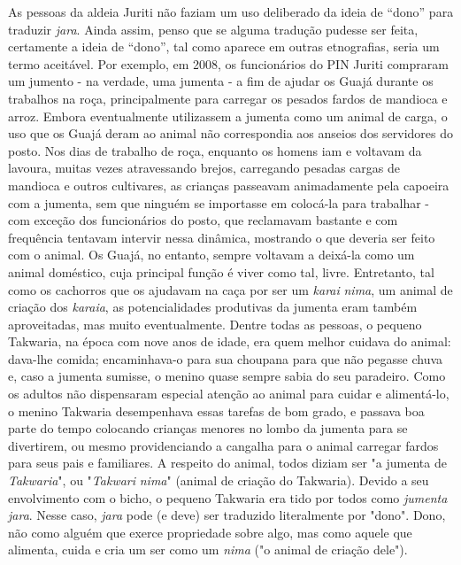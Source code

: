 As pessoas da aldeia Juriti não faziam um uso deliberado da ideia de
``dono'' para traduzir \emph{jara}. Ainda assim, penso que se alguma
tradução pudesse ser feita, certamente a ideia de ``dono'', tal como
aparece em outras etnografias, seria um termo aceitável. Por exemplo, em
2008, os funcionários do PIN Juriti compraram um jumento - na verdade,
uma jumenta - a fim de ajudar os Guajá durante os trabalhos na roça,
principalmente para carregar os pesados fardos de mandioca e arroz.
Embora eventualmente utilizassem a jumenta como um animal de carga, o
uso que os Guajá deram ao animal não correspondia aos anseios dos
servidores do posto. Nos dias de trabalho de roça, enquanto os homens
iam e voltavam da lavoura, muitas vezes atravessando brejos, carregando
pesadas cargas de mandioca e outros cultivares, as crianças passeavam
animadamente pela capoeira com a jumenta, sem que ninguém se importasse
em colocá-la para trabalhar - com exceção dos funcionários do posto, que
reclamavam bastante e com frequência tentavam intervir nessa dinâmica,
mostrando o que deveria ser feito com o animal. Os Guajá, no entanto,
sempre voltavam a deixá-la como um animal doméstico, cuja principal
função é viver como tal, livre. Entretanto, tal como os cachorros que os
ajudavam na caça por ser um \emph{karai} \emph{nima}, um animal de
criação dos \emph{karaia}, as potencialidades produtivas da jumenta eram
também aproveitadas, mas muito eventualmente. Dentre todas as pessoas, o
pequeno Takwaria, na época com nove anos de idade, era quem melhor
cuidava do animal: dava-lhe comida; encaminhava-o para sua choupana para
que não pegasse chuva e, caso a jumenta sumisse, o menino quase sempre
sabia do seu paradeiro. Como os adultos não dispensaram especial atenção
ao animal para cuidar e alimentá-lo, o menino Takwaria desempenhava
essas tarefas de bom grado, e passava boa parte do tempo colocando
crianças menores no lombo da jumenta para se divertirem, ou mesmo
providenciando a cangalha para o animal carregar fardos para seus pais e
familiares. A respeito do animal, todos diziam ser "a jumenta de
\emph{Takwaria}", ou "\emph{Takwari} \emph{nima}" (animal de criação do
Takwaria). Devido a seu envolvimento com o bicho, o pequeno Takwaria era
tido por todos como \emph{jumenta} \emph{jara}. Nesse caso, \emph{jara}
pode (e deve) ser traduzido literalmente por "dono". Dono, não como
alguém que exerce propriedade sobre algo, mas como aquele que alimenta,
cuida e cria um ser como um \emph{nima} ("o animal de criação dele").

